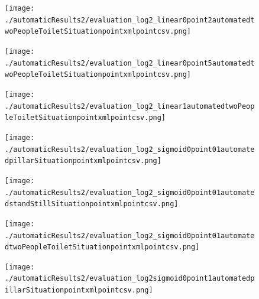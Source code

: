 \documentclass[11pt]{book}
\begin{document}
\begin{figure}
\centering
\texttt{[image: ./automaticResults2/evaluation\_log2\_linear0point2automatedtwoPeopleToiletSituationpointxmlpointcsv.png]}
\label{evaluation_log2_linear0point2automatedtwoPeopleToiletSituationpointxmlpointcsv}
\end{figure}
\clearpage

\begin{figure}
\centering
\texttt{[image: ./automaticResults2/evaluation\_log2\_linear0point5automatedtwoPeopleToiletSituationpointxmlpointcsv.png]}
\label{evaluation_log2_linear0point5automatedtwoPeopleToiletSituationpointxmlpointcsv}
\end{figure}

\begin{figure}
\centering
\texttt{[image: ./automaticResults2/evaluation\_log2\_linear1automatedtwoPeopleToiletSituationpointxmlpointcsv.png]}
\label{evaluation_log2_linear1automatedtwoPeopleToiletSituationpointxmlpointcsv}
\end{figure}

\begin{figure}
\centering
\texttt{[image: ./automaticResults2/evaluation\_log2\_sigmoid0point01automatedpillarSituationpointxmlpointcsv.png]}
\label{evaluation_log2_sigmoid0point01automatedpillarSituationpointxmlpointcsv}
\end{figure}

\begin{figure}
\centering
\texttt{[image: ./automaticResults2/evaluation\_log2\_sigmoid0point01automatedstandStillSituationpointxmlpointcsv.png]}
\label{evaluation_log2_sigmoid0point01automatedstandStillSituationpointxmlpointcsv}
\end{figure}

\begin{figure}
\centering
\texttt{[image: ./automaticResults2/evaluation\_log2\_sigmoid0point01automatedtwoPeopleToiletSituationpointxmlpointcsv.png]}
\label{evaluation_log2_sigmoid0point01automatedtwoPeopleToiletSituationpointxmlpointcsv}
\end{figure}

\begin{figure}
\centering
\texttt{[image: ./automaticResults2/evaluation\_log2sigmoid0point1automatedpillarSituationpointxmlpointcsv.png]}
\label{evaluation_log2sigmoid0point1automatedpillarSituationpointxmlpointcsv}
\end{figure}
\end{document}
